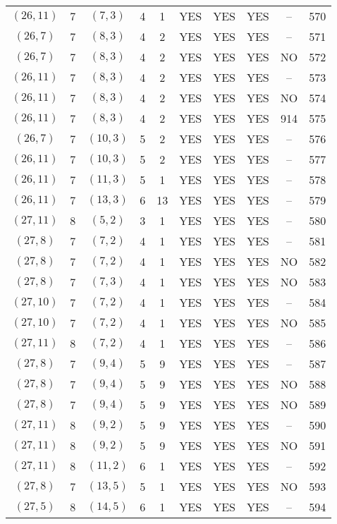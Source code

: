 \begin{longtable}{|c|c|c|c|c|c|c|c|c|c|}
$(26, 11)$ & 7 & $(7, 3)$ & 4 & 1 & YES & YES & YES & -- & 570\\
$(26, 7)$ & 7 & $(8, 3)$ & 4 & 2 & YES & YES & YES & -- & 571\\
$(26, 7)$ & 7 & $(8, 3)$ & 4 & 2 & YES & YES & YES & NO & 572\\
$(26, 11)$ & 7 & $(8, 3)$ & 4 & 2 & YES & YES & YES & -- & 573\\
$(26, 11)$ & 7 & $(8, 3)$ & 4 & 2 & YES & YES & YES & NO & 574\\
$(26, 11)$ & 7 & $(8, 3)$ & 4 & 2 & YES & YES & YES & 914 & 575\\
$(26, 7)$ & 7 & $(10, 3)$ & 5 & 2 & YES & YES & YES & -- & 576\\
$(26, 11)$ & 7 & $(10, 3)$ & 5 & 2 & YES & YES & YES & -- & 577\\
$(26, 11)$ & 7 & $(11, 3)$ & 5 & 1 & YES & YES & YES & -- & 578\\
$(26, 11)$ & 7 & $(13, 3)$ & 6 & 13 & YES & YES & YES & -- & 579\\
$(27, 11)$ & 8 & $(5, 2)$ & 3 & 1 & YES & YES & YES & -- & 580\\
$(27, 8)$ & 7 & $(7, 2)$ & 4 & 1 & YES & YES & YES & -- & 581\\
$(27, 8)$ & 7 & $(7, 2)$ & 4 & 1 & YES & YES & YES & NO & 582\\
$(27, 8)$ & 7 & $(7, 3)$ & 4 & 1 & YES & YES & YES & NO & 583\\
$(27, 10)$ & 7 & $(7, 2)$ & 4 & 1 & YES & YES & YES & -- & 584\\
$(27, 10)$ & 7 & $(7, 2)$ & 4 & 1 & YES & YES & YES & NO & 585\\
$(27, 11)$ & 8 & $(7, 2)$ & 4 & 1 & YES & YES & YES & -- & 586\\
$(27, 8)$ & 7 & $(9, 4)$ & 5 & 9 & YES & YES & YES & -- & 587\\
$(27, 8)$ & 7 & $(9, 4)$ & 5 & 9 & YES & YES & YES & NO & 588\\
$(27, 8)$ & 7 & $(9, 4)$ & 5 & 9 & YES & YES & YES & NO & 589\\
$(27, 11)$ & 8 & $(9, 2)$ & 5 & 9 & YES & YES & YES & -- & 590\\
$(27, 11)$ & 8 & $(9, 2)$ & 5 & 9 & YES & YES & YES & NO & 591\\
$(27, 11)$ & 8 & $(11, 2)$ & 6 & 1 & YES & YES & YES & -- & 592\\
$(27, 8)$ & 7 & $(13, 5)$ & 5 & 1 & YES & YES & YES & NO & 593\\
$(27, 5)$ & 8 & $(14, 5)$ & 6 & 1 & YES & YES & YES & -- & 594\\

\end{longtable}
